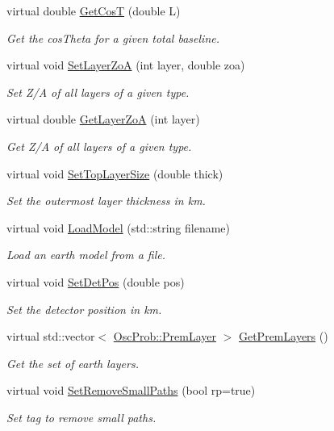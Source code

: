 \begin{DoxyCompactItemize}
virtual double \hyperlink{classOscProb_1_1PremModel_a5328474bdbb703eb4c9d4df49999cda6}{Get\+CosT} (double L)
\begin{DoxyCompactList}\small\item\em Get the cos\+Theta for a given total baseline. \end{DoxyCompactList}\item 
virtual void \hyperlink{classOscProb_1_1PremModel_ac9887d1af4b3c02925fe3228349f593d}{Set\+Layer\+ZoA} (int layer, double zoa)
\begin{DoxyCompactList}\small\item\em Set Z/A of all layers of a given type. \end{DoxyCompactList}\item 
virtual double \hyperlink{classOscProb_1_1PremModel_af1b8392d1b00560c6322bf8707c304f6}{Get\+Layer\+ZoA} (int layer)
\begin{DoxyCompactList}\small\item\em Get Z/A of all layers of a given type. \end{DoxyCompactList}\item 
virtual void \hyperlink{classOscProb_1_1PremModel_a095bd601f6cd91926de9928e96ea7751}{Set\+Top\+Layer\+Size} (double thick)
\begin{DoxyCompactList}\small\item\em Set the outermost layer thickness in km. \end{DoxyCompactList}\item 
virtual void \hyperlink{classOscProb_1_1PremModel_a6363a5e711dd8b0d2e684677e585b293}{Load\+Model} (std\+::string filename)
\begin{DoxyCompactList}\small\item\em Load an earth model from a file. \end{DoxyCompactList}\item 
virtual void \hyperlink{classOscProb_1_1PremModel_a55b314e97ed9b92931e08ada0c0947eb}{Set\+Det\+Pos} (double pos)
\begin{DoxyCompactList}\small\item\em Set the detector position in km. \end{DoxyCompactList}\item 
virtual std\+::vector$<$ \hyperlink{structOscProb_1_1PremLayer}{Osc\+Prob\+::\+Prem\+Layer} $>$ \hyperlink{classOscProb_1_1PremModel_ae4feeccc7027253f5c2e2493098145ca}{Get\+Prem\+Layers} ()
\begin{DoxyCompactList}\small\item\em Get the set of earth layers. \end{DoxyCompactList}\item 
virtual void \hyperlink{classOscProb_1_1PremModel_ac5496d6d5bafcf7740c60838d3eee7b3}{Set\+Remove\+Small\+Paths} (bool rp=true)
\begin{DoxyCompactList}\small\item\em Set tag to remove small paths. \end{DoxyCompactList}\end{DoxyCompactItemize}

